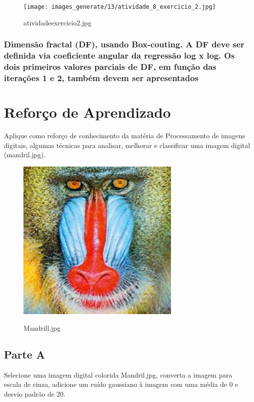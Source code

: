 \documentclass[10pt,a4paper]{article}
\begin{document}
\begin{figure}[H]
    \centering
    {{\texttt{[image: images\_generate/13/atividade\_8\_exercicio\_2.jpg]}}}
    \caption{atividade\textunderscore exercicio\textunderscore 2.jpg}
\end{figure}

\subsubsection{Dimensão fractal (DF), usando Box-couting. A DF deve ser definida via coeficiente angular da regressão log x log. Os dois primeiros valores parciais de DF, em função das iterações 1 e 2, também devem ser apresentados}

\section{Reforço de Aprendizado}

Aplique como reforço de conhecimento da matéria de Processamento de imagens digitais, algumas técnicas para analisar, melhorar e classificar uma imagem digital (mandril.jpg).


\begin{figure}[H]
    \centering
    {{\includegraphics[width=8cm]{images_original/14/Mandrill.jpg}}}
    \caption{Mandrill.jpg}
\end{figure}

\subsection{Parte A}

Selecione uma imagem digital colorida Mandril.jpg, converta a imagem para escala de cinza, adicione um ruído gaussiano à imagem com uma média de 0 e desvio padrão de 20. 
\end{document}
